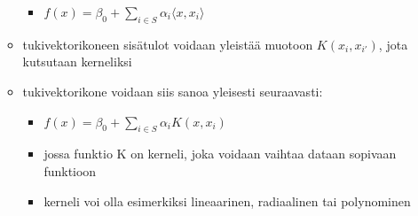 \begin{itemize}
\begin{itemize}
        \begin{itemize}
            \item $f(x) = \beta_0 + \sum_{i \in S} \alpha_i \langle x, x_i \rangle$
        \end{itemize}
        \item tukivektorikoneen sisätulot voidaan yleistää muotoon $K(x_i, x_{i'})$, jota kutsutaan kerneliksi
        \item tukivektorikone voidaan siis sanoa yleisesti seuraavasti:
        \begin{itemize}
            \item $f(x) = \beta_0 + \sum_{i \in S} \alpha_i K(x, x_i)$
            \item jossa funktio K on kerneli, joka voidaan vaihtaa dataan sopivaan funktioon
            \item kerneli voi olla esimerkiksi lineaarinen, radiaalinen tai polynominen
        \end{itemize}
    \end{itemize}
\end{itemize}


